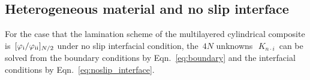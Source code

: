\documentclass[preprint,12pt,times]{elsarticle}
\newcommand{\minus}[1]{\check{#1}}
\numberwithin{equation}{section}
\newcommand{\pr}[1]{\left( #1 \right)}
\newcommand{\p}{\,\textsf{\small pow}}
\newcommand{\msub}[2]{
\IfEqCase{#2}{
      {i}{\, m_{#1\cdot #2}\,}%
  }[\,m_{#1\cdot {\scriptscriptstyle #2}}\,]}
\newcommand{\gsub}[2]{g_{#1\cdot #2}}
\newcommand{\Qsub}[2]{Q_{#1\cdot #2}}
\newcommand{\Wsub}[2]{
\IfEqCase{#2}{
      {i}{\, W_{#1\cdot #2}\,}%
  }[\,W_{#1\cdot {\scriptscriptstyle #2}}\,]}
\newcommand{\Ksub}[2]{\,K_{ {#1}\cdot {\scriptscriptstyle #2}}\,}
\newcommand{\RN}[1]{%
  \textup{\uppercase\expandafter{\romannumeral#1}}%
}
\renewcommand{\>}{$\Rightarrow$}
\begin{document}
\subsection{Heterogeneous material and no slip interface}
\label{sec:2mat_no_slip}
For the case that the lamination scheme of the multilayered cylindrical composite is~$[\varphi_{\RN{1}}/\varphi_{\RN{2}}]_{N/2}$ under no slip interfacial condition, the~$4N$ unknowns~$\Ksub{n}{i}$ can be solved from the boundary conditions by Eqn.~\eqref{eq:boundary} and the interfacial conditions by Eqn.~\eqref{eq:noslip_interface}.
\end{document}
